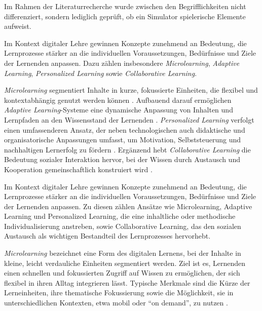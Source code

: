 Im Rahmen der Literaturrecherche wurde zwischen den Begrifflichkeiten nicht differenziert, sondern lediglich geprüft, ob ein Simulator spielerische Elemente aufweist.

Im Kontext digitaler Lehre gewinnen Konzepte zunehmend an Bedeutung, die Lernprozesse stärker an die individuellen Voraussetzungen, Bedürfnisse und Ziele der Lernenden anpassen. Dazu zählen insbesondere \textit{Microlearning}, \textit{Adaptive Learning}, \textit{Personalized Learning} sowie \textit{Collaborative Learning}. 

\textit{Microlearning} segmentiert Inhalte in kurze, fokussierte Einheiten, die flexibel und kontextabhängig genutzt werden können \parencite[S.~74]{chong_mvr-cls_2022}. Aufbauend darauf ermöglichen \textit{Adaptive Learning}-Systeme eine dynamische Anpassung von Inhalten und Lernpfaden an den Wissensstand der Lernenden \parencite[S.~448]{zhao_research_2019}. \textit{Personalized Learning} verfolgt einen umfassenderen Ansatz, der neben technologischen auch didaktische und organisatorische Anpassungen umfasst, um Motivation, Selbststeuerung und nachhaltigen Lernerfolg zu fördern \parencites[S.~6ff]{pane_informing_2017}[S.~2f]{gunawardena_personalized_2024}[S.~236ff]{walkington_appraising_2020}. Ergänzend hebt \textit{Collaborative Learning} die Bedeutung sozialer Interaktion hervor, bei der Wissen durch Austausch und Kooperation gemeinschaftlich konstruiert wird \parencite[S.~486]{laal_benefits_2021}.

\iffalse
Im Kontext digitaler Lehre gewinnen Konzepte zunehmend an Bedeutung, die Lernprozesse stärker an die individuellen Voraussetzungen, Bedürfnisse und Ziele der Lernenden anpassen. Zu diesen zählen Ansätze wie Microlearning, Adaptive Learning und Personalized Learning, die eine inhaltliche oder methodische Individualisierung anstreben, sowie Collaborative Learning, das den sozialen Austausch als wichtigen Bestandteil des Lernprozesses hervorhebt.

\textit{Microlearning} bezeichnet eine Form des digitalen Lernens, bei der Inhalte in kleine, leicht verdauliche Einheiten segmentiert werden. Ziel ist es, Lernenden einen schnellen und fokussierten Zugriff auf Wissen zu ermöglichen, der sich flexibel in ihren Alltag integrieren lässt. Typische Merkmale sind die Kürze der Lerneinheiten, ihre thematische Fokussierung sowie die Möglichkeit, sie in unterschiedlichen Kontexten, etwa mobil oder \enquote{on demand}, zu nutzen \parencite[S.~74]{chong_mvr-cls_2022}.


